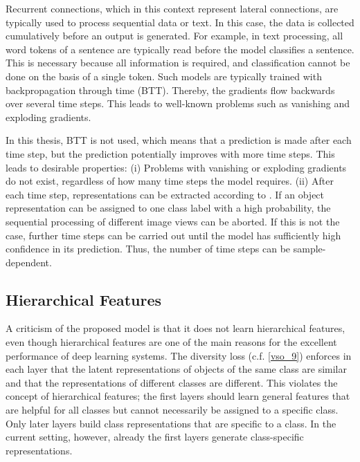 Recurrent connections, which in this context represent lateral connections, are typically used to process sequential data or text. In this case, the data is collected cumulatively before an output is generated. For example, in text processing, all word tokens of a sentence are typically read before the model classifies a sentence. This is necessary because all information is required, and classification cannot be done on the basis of a single token. Such models are typically trained with backpropagation through time (BTT). Thereby, the gradients flow backwards over several time steps. This leads to well-known problems such as vanishing and exploding gradients.

In this thesis, BTT is not used, which means that a prediction is made after each time step, but the prediction potentially improves with more time steps. This leads to desirable properties: (i) Problems with vanishing or exploding gradients do not exist, regardless of how many time steps the model requires. (ii) After each time step, representations can be extracted according to . If an object representation can be assigned to one class label with a high probability, the sequential processing of different image views can be aborted. If this is not the case, further time steps can be carried out until the model has sufficiently high confidence in its prediction. Thus, the number of time steps can be sample-dependent.



\subsection{Hierarchical Features}
A criticism of the proposed model is that it does not learn hierarchical features, even though hierarchical features are one of the main reasons for the excellent performance of deep learning systems. The diversity loss (c.f. \eqref{vso_9})  enforces in each layer that the latent representations of objects of the same class are similar and that the representations of different classes are different. This violates the concept of hierarchical features; the first layers should learn general features that are helpful for all classes but cannot necessarily be assigned to a specific class. Only later layers build class representations that are specific to a class. In the current setting, however, already the first layers generate class-specific representations.

